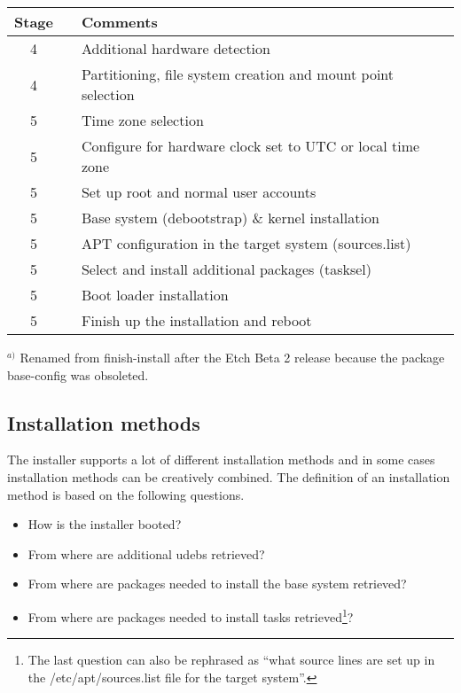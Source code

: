 \documentclass[a4paper,10pt]{article}
\begin{document}
\begin{tabular}{|c|p{6.5cm}|p{8cm}|}
\hline
\textbf{Stage} & & \textbf{Comments} \\
\hline
4 & \centering{hw-detect} & Additional hardware detection \\
\hline
4 & \centering{partman} & Partitioning, file system creation and mount point selection \\
\hline
5 & \centering{tzsetup} & Time zone selection \\
\hline
5 & \centering{clock-setup} & Configure for hardware clock set to UTC or local time zone \\
\hline
5 & \centering{user-setup} & Set up root and normal user accounts \\
\hline
5 & \centering{base-installer} & Base system (debootstrap) \& kernel installation \\
\hline
5 & \centering{apt-setup} & APT configuration in the target system (sources.list) \\
\hline
5 & \centering{pkgsel} & Select and install additional packages (tasksel) \\
\hline
5 & \centering{grub/lilo-installer; nobootloader} & Boot loader installation \\
\hline
5 & \centering{finish-install$^{a)}$} & Finish up the installation and reboot \\
\hline
\end{tabular} 

\begin{flushleft}
$^{a)}$ Renamed from finish-install after the Etch Beta 2 release because the package base-config was obsoleted.
\end{flushleft}


\subsection{Installation methods}
The installer supports a lot of different installation methods and in some cases installation methods can be creatively combined. The definition of an installation method is based on the following questions. 

\begin{itemize}
\item How is the installer booted? 
\item From where are additional udebs retrieved? 
\item From where are packages needed to install the base system retrieved? 
\item From where are packages needed to install tasks retrieved\footnote{The last question can also be rephrased as “what source lines are set up in the /etc/apt/sources.list file for the target system”.}? 
\end{itemize}
\end{document}
